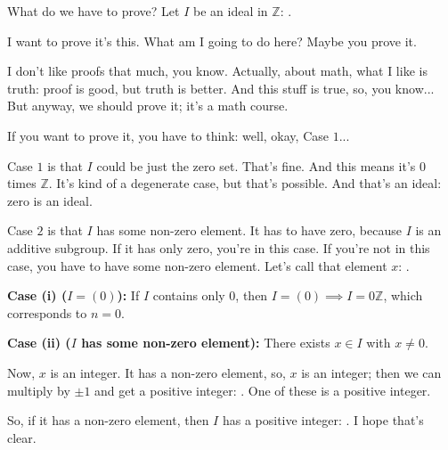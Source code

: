 \begin{proofWrapper}

\begin{speech}[00:50:43 - 00:52:00]
 What do we have to prove? Let $I$ be an ideal in $\mathbb{Z}$: .

I want to prove it's this. What am I going to do here? Maybe you prove it.

I don't like proofs that much, you know. Actually, about math, what I like is truth: proof is good, but truth is better. And this stuff is true, so, you know... But anyway, we should prove it; it's a math course.

If you want to prove it, you have to think: well, okay, Case $1$... 

Case $1$ is that $I$ could be just the zero set. That's fine. And this means it's $0$ times $\mathbb{Z}$. It's kind of a degenerate case, but that's possible. And that's an ideal: zero is an ideal.

Case $2$ is that $I$ has some non-zero element.  It has to have zero, because $I$ is an additive subgroup. If it has only zero, you're in this case. If you're not in this case, you have to have some non-zero element. Let's call that element $x$: .
\end{speech}

\begin{content}
\textbf{Case (i) ($I = (0)$):}
If $I$ contains only $0$, then $I = (0) \implies I = 0\mathbb{Z}$, which corresponds to $n = 0$.

\textbf{Case (ii) ($I$ has some non-zero element):}
There exists $x \in I$ with $x \neq 0$.
\end{content}

\begin{speech}[00:52:00 - 00:53:05]
Now, $x$ is an integer. It has a non-zero element, so, $x$ is an integer; then we can multiply by $\pm 1$ and get a positive integer: . One of these is a positive integer.

So, if it has a non-zero element, then $I$ has a positive integer: . I hope that's clear.
\end{speech}


\end{proofWrapper}
